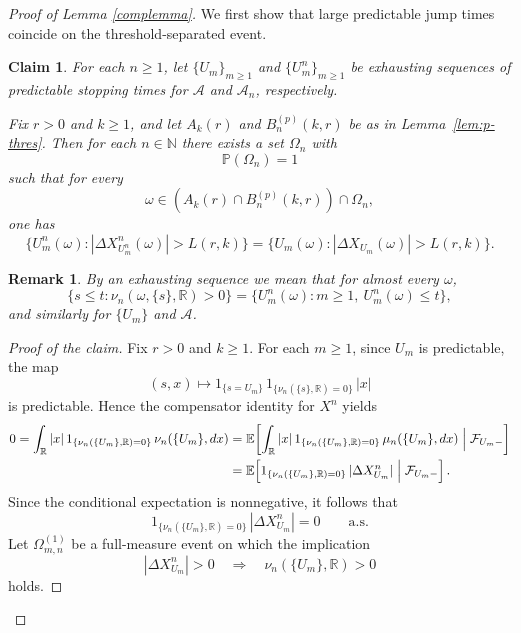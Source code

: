 \documentclass[a4paper,10pt]{article}
\newtheorem{claim}[thm]{Claim}
\newtheorem{rema}[thm]{Remark}
\newcommand{\E}{\mathbb E}
\newcommand{\N}{\mathbb N}
\begin{document}
\begin{proof}[Proof of Lemma \ref{complemma}]
We first show that large predictable jump times coincide on the threshold-separated event.
\begin{claim}
\label{claim:exact-jump-matching-prob}
For each $n\ge1$, let $\{U_m\}_{m\ge1}$ and $\{U_m^n\}_{m\ge1}$ be exhausting sequences of predictable
stopping times for $\mathcal{A}$ and $\mathcal{A}_n$, respectively.

Fix $r>0$ and $k\ge1$, and let $A_k(r)$ and $B_n^{(p)}(k,r)$ be as in
Lemma~\ref{lem:p-thres}. Then for each $n\in\N$ there exists a set $\Omega_{n}$ with
\[
\mathbb P(\Omega_{n})=1
\]
such that for every
\[
\omega\in (A_k(r)\cap B_n^{(p)}(k,r))\cap \Omega_{n},
\]
one has
\[
\{U_m^n(\omega): |\Delta X^n_{U_m^n}(\omega)|>L(r,k)\}
=
\{U_m(\omega): |\Delta X_{U_m}(\omega)|>L(r,k)\}.
\]
\end{claim}

\begin{rema}
By an exhausting sequence we mean that for almost every $\omega$,
\[
\{s\le t:\nu_n(\omega,\{s\},\mathbb R)>0\}
=
\{U_m^n(\omega):m\ge1,\ U_m^n(\omega)\le t\},
\]
and similarly for $\{U_m\}$ and $\mathcal{A}$.
\end{rema}


\begin{proof}[Proof of the claim]
Fix $r>0$ and $k\ge1$. For each $m\ge1$, since $U_m$ is predictable, the map
\[
(s,x)\mapsto 1_{\{s=U_m\}}\,1_{\{\nu_n(\{s\},\mathbb R)=0\}}\,|x|
\]
is predictable. Hence the compensator identity for $X^n$ yields
\begin{align*}
0
=
\int_{\mathbb R}
|x|\,1_{\{\nu_n(\{U_m\},\mathbb R)=0\}}\,\nu_n(\{U_m\},dx)
&=
\E\!\left[
\int_{\mathbb R}
|x|\,1_{\{\nu_n(\{U_m\},\mathbb R)=0\}}\,\mu_n(\{U_m\},dx)
\Bigm| \mathcal F_{U_m-}
\right]
\\
&=
\E\!\left[
1_{\{\nu_n(\{U_m\},\mathbb R)=0\}}\,|\Delta X^n_{U_m}|
\Bigm| \mathcal F_{U_m-}
\right].
\end{align*}
Since the conditional expectation is nonnegative, it follows that
\[
1_{\{\nu_n(\{U_m\},\mathbb R)=0\}}\,|\Delta X^n_{U_m}|=0
\qquad \text{a.s.}
\]
Let $\Omega^{(1)}_{m,n}$ be a full-measure event on which the implication
\[
|\Delta X^n_{U_m}|>0
\quad\Longrightarrow\quad
\nu_n(\{U_m\},\mathbb R)>0
\]
holds.


\end{proof}
\end{proof}
\end{document}
